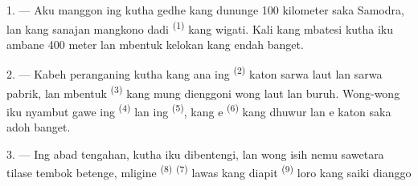 %
%

\VUsaut{2.0mm}
\VUsaut{3.0mm}
\VUfilet{16mm}
\VUsaut{5.6mm}
\VUsaut{1.4mm}
\VUsaut{2.2mm}

\VUsaut{3.0mm}
\VUsaut{3.0mm}

1. --- Aku manggon ing kutha gedhe kang dununge 100 kilometer saka
Samodra, lan kang sanajan mangkono dadi 
\textsuperscript{(1)} kang wigati. Kali kang mbatesi kutha iku ambane
400 meter lan mbentuk kelokan kang endah banget.

2. --- Kabeh peranganing kutha kang ana ing 
\textsuperscript{(2)} katon sarwa laut lan sarwa pabrik, lan mbentuk
 \textsuperscript{(3)} kang mung dienggoni wong laut
lan buruh. Wong-wong iku nyambut gawe ing 
\textsuperscript{(4)} lan ing  \textsuperscript{(5)},
kang e \textsuperscript{(6)} kang dhuwur lan
e katon saka adoh banget.

3. --- Ing abad tengahan, kutha iku dibentengi, lan wong isih nemu
sawetara tilase tembok betenge, mligine 
\textsuperscript{(8)}  \textsuperscript{(7)} lawas
kang diapit  \textsuperscript{(9)} loro kang saiki dianggo

